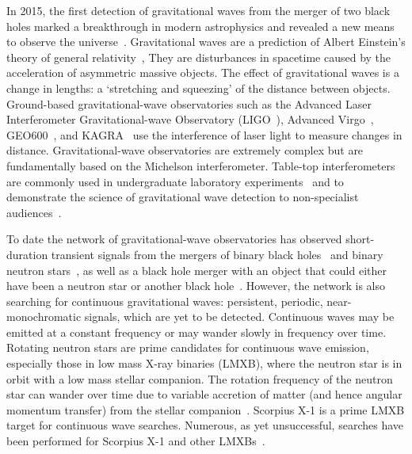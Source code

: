 \documentclass[paper-main.tex]{subfiles}
\begin{document}
In 2015, the first detection of gravitational waves from the merger of two black holes marked a breakthrough in modern astrophysics and revealed a new means to observe the universe~\cite{GW150914}.
Gravitational waves are a prediction of Albert Einstein's theory of general relativity~\cite{Einstein:1916}, 
They are disturbances in spacetime caused by the acceleration of asymmetric massive objects.
The effect of gravitational waves is a change in lengths: a `stretching and squeezing' of the distance between objects. 
Ground-based gravitational-wave observatories such as the Advanced Laser Interferometer Gravitational-wave Observatory (LIGO~\cite{AdvancedLIGO:2015}), Advanced Virgo~\cite{AdvancedVirgo:2015}, GEO600~\cite{GEO600:2010}, and KAGRA~\cite{KAGRA:2013} use the interference of laser light to measure changes in distance. 
Gravitational-wave observatories are extremely complex but are fundamentally based on the Michelson interferometer. 
Table-top interferometers are commonly used in undergraduate laboratory experiments~\cite{UgoliniEtAl:2019} and to demonstrate the science of gravitational wave detection to non-specialist audiences~\cite{ThorLabsIFO,NikhefIFO,AMIGO:online,TTExhibit:2020,LIGOIFOGlue,LIGOIFOMagnets}.


To date the network of gravitational-wave observatories has observed short-duration transient signals from the mergers of binary black holes~\cite{GW150914,GW151226,GW170104,GW170814,GW190521,GWTC-1:2018,GWTC-2:2020} and binary neutron stars~\cite{GW170817,GW170817multi,GW190425,GWTC-1:2018,GWTC-2:2020}, as well as a black hole merger with an object that could either have been a neutron star or another black hole~\cite{GW190814}. 
However, the network is also searching for continuous gravitational waves: persistent, periodic, near-monochromatic signals, which are yet to be detected. 
Continuous waves may be emitted at a constant frequency or may wander slowly in frequency over time. 
Rotating neutron stars are prime candidates for continuous wave emission, especially those in low mass X-ray binaries (LMXB), where the neutron star is in orbit with a low mass stellar companion.
The rotation frequency of the neutron star can wander over time due to variable accretion of matter (and hence angular momentum transfer) from the stellar companion~\cite{xraybinaries:1997}. 
Scorpius X-1 is a prime LMXB target for continuous wave searches. 
Numerous, as yet unsuccessful, searches have been performed for Scorpius X-1 and other LMXBs~\cite{ScoX1O2Viterbi:2019, ScoX1ViterbiO1:2017, RadiometerO1O2:2019, SearchRadiometerO1:2017, SearchCrossCorrO1:2017, ScoX1ViterbiO1:2017, SearchTwoSpecS6:2017, MiddletonEtAlO2LMXBs:2020}. 
\end{document}
